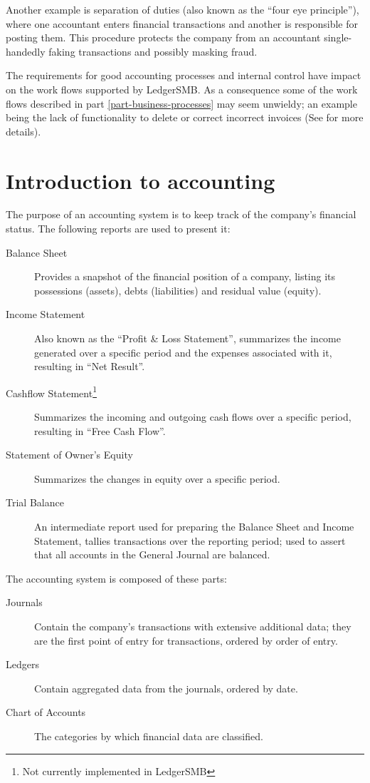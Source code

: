 Another example is separation of duties (also known as the ``four eye principle''),
where one accountant enters financial transactions and another is responsible for
posting them. This procedure protects the company from an accountant single-handedly
faking transactions and possibly masking fraud.

The requirements for good accounting processes and internal control have impact
on the work flows supported by LedgerSMB. As a consequence some of the work flows
described in part \ref{part-business-processes} may seem unwieldy; an example being the
lack of functionality to delete or correct incorrect invoices (See  for more details).



\chapter{Introduction to accounting}
\label{cha-accounting-introduction}

The purpose of an accounting system is to keep track of the company's financial status.  The following reports are used to
present it:

\begin{description}
	\item[Balance Sheet] Provides a snapshot of the financial position of a company, listing its possessions (assets), debts (liabilities) and residual value (equity).
	\item[Income Statement] Also known as the ``Profit \& Loss Statement'', summarizes the income generated over a specific period and the expenses associated with it, resulting in ``Net Result''.
	\item[Cashflow Statement\footnote{\label{cha-accounting-footnote-not-implemented}Not currently implemented in LedgerSMB}] Summarizes the incoming and outgoing cash flows over a specific period, resulting in ``Free Cash Flow''.
	\item[Statement of Owner's Equity] Summarizes the changes in equity over a specific period.
	\item[Trial Balance] An intermediate report used for preparing the Balance Sheet and Income Statement, tallies transactions over the reporting period; used to assert that all accounts in the General Journal are balanced.
\end{description}

The accounting system is composed of these parts:
\begin{description}
        \item [Journals] Contain the company's transactions with extensive additional data; they are the first point of entry for transactions, ordered by order of entry.
        \item [Ledgers] Contain aggregated data from the journals, ordered by date.
        \item [Chart of Accounts] The categories by which financial data are classified.
\end{description}

